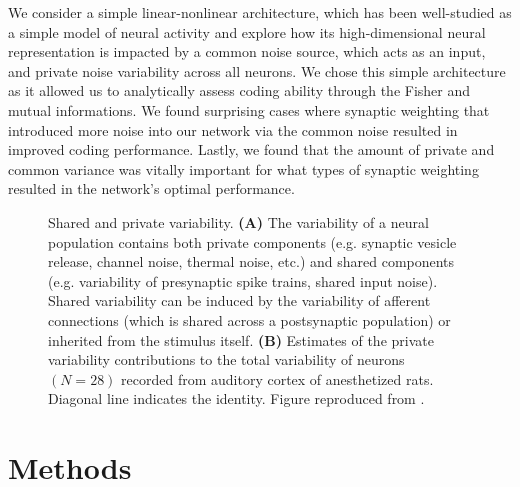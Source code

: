 \documentclass[12pt]{article}
\begin{document}
We consider a simple linear-nonlinear architecture, which has been well-studied as a simple model of neural activity \citep{karklin2011} and explore how its high-dimensional neural representation is impacted by a common noise source, which acts as an input, and private noise variability across all neurons. We chose this simple architecture as it allowed us to analytically assess coding ability through the Fisher and mutual informations. We found surprising cases where synaptic weighting that introduced more noise into our network via the common noise resulted in improved coding performance. Lastly, we found that the amount of private and common variance was vitally important for what types of synaptic weighting resulted in the network's optimal performance.
\begin{figure}[b]
	\centering
	\caption{Shared and private variability. \textbf{(A)} The variability of a neural population contains both private components (e.g. synaptic vesicle release, channel noise, thermal noise, etc.) and shared components (e.g. variability of presynaptic spike trains, shared input noise). Shared variability can be induced by the variability of afferent connections (which is shared across a postsynaptic population) or inherited from the stimulus itself.  \textbf{(B)} Estimates of the private variability contributions to the total variability of neurons $(N=28)$ recorded from auditory cortex of anesthetized rats. Diagonal line indicates the identity. Figure reproduced from \cite{deweese2004}.}
	\label{fig:private-shared}
\end{figure}

\section{Methods}
\end{document}
